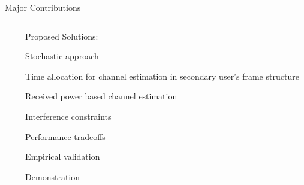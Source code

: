\documentclass[16pt]{beamer}
\newcommand{\fs}[2]{\fontsize{#1 pt}{#2}\selectfont}
\begin{document}
\begin{frame}[t]{Major Contributions}
\begin{columns}
		\begin{column}{0.03\columnwidth}
		\end{column}
		
		\begin{column}[t]{0.44\columnwidth}
			\centering Proposed Solutions: \\[-0.2em]
			\fs{8}{8}
			\begin{block}{}
				\centering
			  	Stochastic approach%
			\end{block}
			\vspace{-0.5mm}
			\begin{block}{}
				\centering
			   	Time allocation for channel estimation in secondary user's frame structure
			\end{block}
			\vspace{-0.5mm}
			\onslide<2->
			{
			\begin{block}{}
				\centering
				Received power based channel estimation
			\end{block}
			}
			\vspace{7.0mm}
			\onslide<3->
			{
			\begin{block}{}
				\centering
			  	Interference constraints  %
			\end{block}
			}	
			\vspace{-0.5mm}
			\onslide<3->
			{
			\begin{block}{}
				\centering
			 	Performance tradeoffs %
			\end{block}
			}
			\vspace{-0.5mm}
			\onslide<4->
			{
			\begin{block}{}
				\centering
				Empirical validation 
			\end{block}
			\vspace{-0.5mm}
			\onslide<4->
			\begin{block}{}
				\centering
				Demonstration
			\end{block}
			}
		\end{column}
	\end{columns}
\end{frame}
\end{document}
